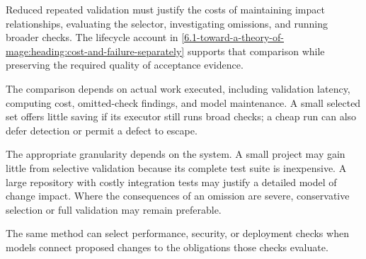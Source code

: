 Reduced repeated validation must justify the costs of maintaining impact relationships, evaluating the selector, investigating omissions, and running broader checks. The lifecycle account in \autoref{6.1-toward-a-theory-of-mage:heading:cost-and-failure-separately} supports that comparison while preserving the required quality of acceptance evidence.

The comparison depends on actual work executed, including validation latency, computing cost, omitted-check findings, and model maintenance. A small selected set offers little saving if its executor still runs broad checks; a cheap run can also defer detection or permit a defect to escape.

The appropriate granularity depends on the system. A small project may gain little from selective validation because its complete test suite is inexpensive. A large repository with costly integration tests may justify a detailed model of change impact. Where the consequences of an omission are severe, conservative selection or full validation may remain preferable.

The same method can select performance, security, or deployment checks when models connect proposed changes to the obligations those checks evaluate.
